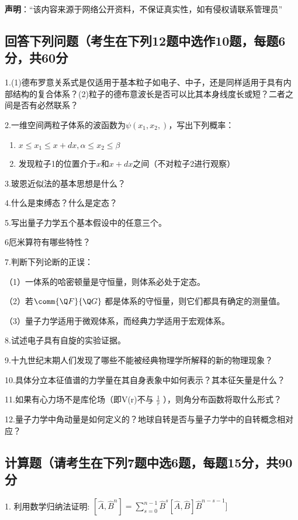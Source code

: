 
\textbf{声明}：“该内容来源于网络公开资料，不保证真实性，如有侵权请联系管理员”

\subsection{回答下列问题（考生在下列12题中选作10题，每题6分，共60分}

1.(1)德布罗意关系式是仅适用于基本粒子如电子、中子，还是同样适用于具有内部结构的复合体系？(2)粒子的德布意波长是否可以比其本身线度长或短？二者之间是否有必然联系？

2.一维空间两粒子体系的波函数为$\psi (x_1, x_2, )$，写出下列概率：
\begin{enumerate}
    \item $x \leq x_1 \leq x + dx, \alpha \leq x_2 \leq \beta$
    \item 发现粒子1的位置介于$x$和$x + dx$之间（不对粒子2进行观察）
\end{enumerate}

3.玻恩近似法的基本思想是什么？

4.什么是束缚态？什么是定态？

5.写出量子力学五个基本假设中的任意三个。

6厄米算符有哪些特性？

7.判断下列论断的正误：

（1）一体系的哈密顿量是守恒量，则体系必处于定态。

（2）若$\comm{\Q F}{\Q G}$ 都是体系的守恒量，则它们都具有确定的测量值。

（3）量子力学适用于微观体系，而经典力学适用于宏观体系。

8.试述电子具有自旋的实验证据。

9.十九世纪末期人们发现了哪些不能被经典物理学所解释的新的物理现象？

10.具体分立本征值谱的力学量在其自身表象中如何表示？其本征矢量是什么？

11.如果有心力场不是库伦场（即V(r)不与 $\frac{1}{r}$ ），则角分布函数将取什么形式？

12.量子力学中角动量是如何定义的？地球自转是否与量子力学中的自转概念相对应？

\subsection{计算题（请考生在下列7题中选6题，每题15分，共90分}

1. 利用数学归纳法证明:
$[\hat{A}, \hat{B}^n] = \sum_{s=0}^{n-1} \hat{B}^s [\hat{A}, \hat{B}] \hat{B}^{n-s-1}]$

